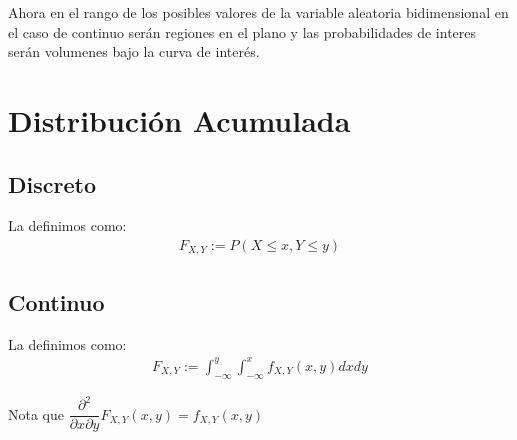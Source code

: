 \documentclass[12pt, fleqn]{report}                             %
\theoremstyle{break}                                            %
\begin{document}
                Ahora en el rango de los posibles valores de la variable aleatoria bidimensional
                en el caso de continuo serán regiones en el plano y las probabilidades de interes
                serán volumenes bajo la curva de interés.
                


        \clearpage
        \section{Distribución Acumulada}

            \vspace{1em}
            \subsection{Discreto}

                La definimos como:
                \begin{align*}
                    F_{X, Y} := P(X \leq x, Y \leq y)
                \end{align*}


            \vspace{1em}
            \subsection{Continuo}

                La definimos como:
                \begin{align*}
                    F_{X, Y} := \int_{-\infty}^y \int_{-\infty}^x f_{X, Y}(x, y) dx dy 
                \end{align*}

                Nota que $\dfrac{\partial^2}{\partial x \partial y} F_{X, Y}(x, y) = f_{X, Y}(x, y)$



        \clearpage
\end{document}
